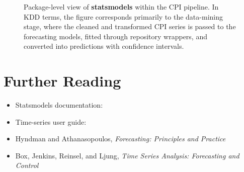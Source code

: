 \begin{figure}[htbp]
\centering
\resizebox{0.95\linewidth}{!}{
}
\caption{Package-level view of \textbf{statsmodels} within the CPI pipeline. In KDD terms, the figure corresponds primarily to the data-mining stage, where the cleaned and transformed CPI series is passed to the forecasting models, fitted through repository wrappers, and converted into predictions with confidence intervals.}
\label{fig:statsmodels_workflow}
\end{figure}

\section{Further Reading}

\begin{itemize}
    \item Statsmodels documentation: 
    \item Time-series user guide: 
    \item Hyndman and Athanasopoulos, \textit{Forecasting: Principles and Practice} \cite{Hyndman2021}
    \item Box, Jenkins, Reinsel, and Ljung, \textit{Time Series Analysis: Forecasting and Control} \cite{Box2015}
\end{itemize}
